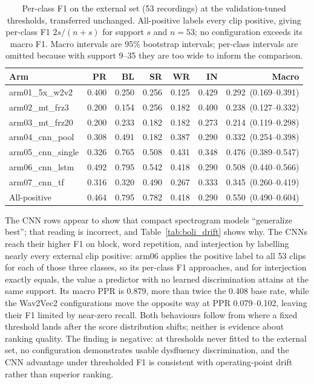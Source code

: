 \documentclass[a4paper,orivec]{llncs}
\newcommand{\ci}[1]{{\scriptsize\,(#1)}}
\begin{document}
\begin{table}[!htbp]
\caption{Per-class F1 on the external set (53 recordings) at the
validation-tuned thresholds, transferred unchanged. All-positive labels every
clip positive, giving per-class F1 $2s/(n+s)$ for support $s$ and $n=53$; no
configuration exceeds its macro F1. Macro intervals are 95\% bootstrap intervals;
per-class intervals are omitted because with support 9--35 they are too wide to
inform the comparison.}
\label{tab:boli_perclass}
\centering
\small
\renewcommand{\arraystretch}{0.9}
\begin{tabular}{lrrrrrr}
\hline
Arm & PR & BL & SR & WR & IN & Macro\\
\hline
arm01\_5x\_w2v2 & 0.400 & 0.250 & 0.256 & 0.125 & 0.429 & 0.292 \ci{0.169--0.391}\\
arm02\_mt\_frz3 & 0.200 & 0.154 & 0.256 & 0.182 & 0.400 & 0.238 \ci{0.127--0.332}\\
arm03\_mt\_frz20 & 0.200 & 0.233 & 0.182 & 0.182 & 0.273 & 0.214 \ci{0.119--0.298}\\
arm04\_cnn\_pool & 0.308 & 0.491 & 0.182 & 0.387 & 0.290 & 0.332 \ci{0.254--0.398}\\
arm05\_cnn\_single & 0.326 & 0.765 & 0.508 & 0.431 & 0.348 & 0.476 \ci{0.389--0.547}\\
arm06\_cnn\_lstm & 0.492 & 0.795 & 0.542 & 0.418 & 0.290 & 0.508 \ci{0.440--0.566}\\
arm07\_cnn\_tf & 0.316 & 0.320 & 0.490 & 0.267 & 0.333 & 0.345 \ci{0.260--0.419}\\
\hline
All-positive & 0.464 & 0.795 & 0.782 & 0.418 & 0.290 & 0.550 \ci{0.490--0.604}\\
\hline
\end{tabular}
\end{table}

The CNN rows appear to show that compact spectrogram models ``generalize best'';
that reading is incorrect, and Table~\ref{tab:boli_drift} shows why. The CNNs
reach their higher F1 on block, word repetition, and interjection by labelling
nearly every external clip positive: arm06 applies the positive label to all 53
clips for each of those three classes, so its per-class F1 approaches, and for
interjection exactly equals, the value a predictor with no learned discrimination
attains at the same support. Its macro PPR is 0.879, more than twice the 0.408
base rate, while the Wav2Vec2 configurations move the opposite way at PPR
0.079--0.102, leaving their F1 limited by near-zero recall. Both behaviours follow
from where a fixed threshold lands after the score distribution shifts; neither
is evidence about ranking quality. The finding is negative: at thresholds never
fitted to the external set, no configuration demonstrates usable dysfluency
discrimination, and the CNN advantage under thresholded F1 is consistent with
operating-point drift rather than superior ranking.
\end{document}
